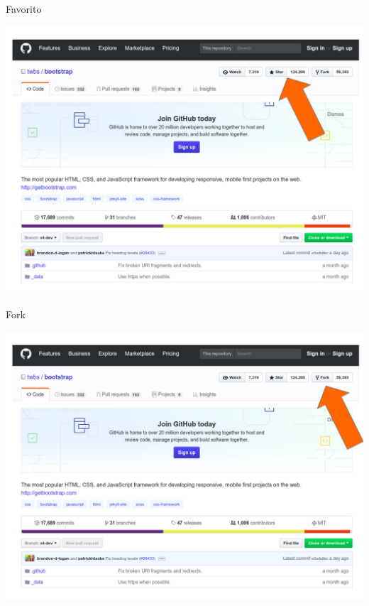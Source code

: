 \documentclass{beamer}
\begin{document}
\begin{frame}{Favorito}
  \begin{center}
       
\includegraphics[height=0.7\paperheight]{favorito_projeto.png} \\
      \end{center}
 
\end{frame}
\begin{frame}{Fork}
  \begin{center}
       
\includegraphics[height=0.7\paperheight]{fork_projeto.png} \\
      \end{center}
 
\end{frame}
\end{document}
